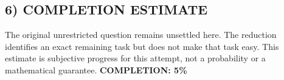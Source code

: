 \subsection{6) COMPLETION ESTIMATE}
The original unrestricted question remains unsettled here. The reduction identifies an exact remaining task but does not make that task easy. This estimate is subjective progress for this attempt, not a probability or a mathematical guarantee.
\textbf{COMPLETION: 5\%}

